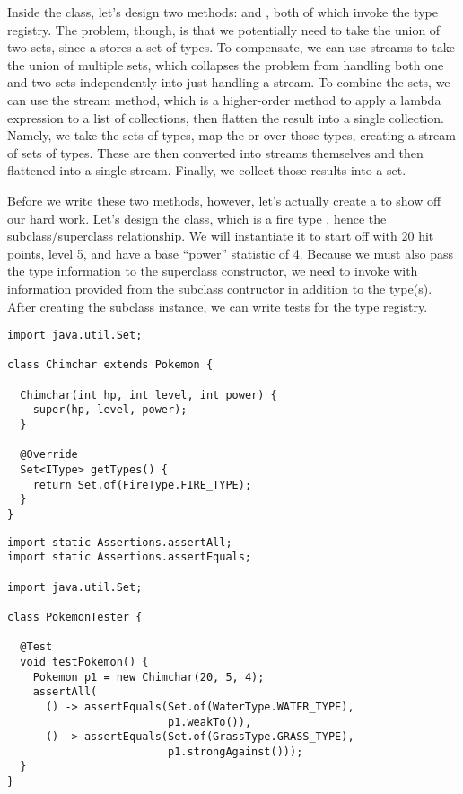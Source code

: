 Inside the  class, let's design two methods:  and , both of which invoke the type registry. The problem, though, is that we potentially need to take the union of two sets, since a  stores a set of types. To compensate, we can use streams to take the union of multiple sets, which collapses the problem from handling both one and two sets independently into just handling a stream. To combine the sets, we can use the  stream method, which is a higher-order method to apply a lambda expression to a list of collections, then flatten the result into a single collection. Namely, we take the sets of types, map the  or  over those types, creating a stream of sets of types. These are then converted into streams themselves and then flattened into a single stream. Finally, we collect those results into a set. 

Before we write these two methods, however, let's actually create a  to show off our hard work. Let's design the  class, which is a fire type , hence the subclass/superclass relationship. We will instantiate it to start off with 20 hit points, level 5, and have a base ``power'' statistic of 4. Because we must also pass the type information to the superclass constructor, we need to invoke  with information provided from the subclass contructor in addition to the type(s). After creating the subclass instance, we can write tests for the type registry. 

\begin{lstlisting}[language=MyJava]
import java.util.Set;

class Chimchar extends Pokemon {

  Chimchar(int hp, int level, int power) {
    super(hp, level, power);
  }

  @Override
  Set<IType> getTypes() {
    return Set.of(FireType.FIRE_TYPE);
  }
}
\end{lstlisting}

\begin{lstlisting}[language=MyJava]
import static Assertions.assertAll;
import static Assertions.assertEquals;

import java.util.Set;

class PokemonTester {

  @Test
  void testPokemon() {
    Pokemon p1 = new Chimchar(20, 5, 4);
    assertAll(
      () -> assertEquals(Set.of(WaterType.WATER_TYPE),
                         p1.weakTo()),
      () -> assertEquals(Set.of(GrassType.GRASS_TYPE),
                         p1.strongAgainst()));
  }
}
\end{lstlisting}


